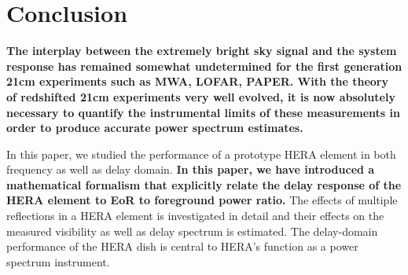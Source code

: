 \documentclass[twocolumn]{emulateapj}
\begin{document}
    \section{\textbf{Conclusion}}
     \textbf{The interplay between the extremely bright sky signal and the system response
    has remained somewhat undetermined for the first generation 21cm experiments such
    as MWA, LOFAR, PAPER. With the theory of redshifted 21cm experiments very
    well evolved, it is now absolutely necessary to quantify the instrumental limits
    of these measurements in order to produce accurate power spectrum estimates.}
    
    
    In this paper, we studied the performance of a prototype HERA element in both frequency
    as well as delay domain. \textbf{In this paper, we have introduced a mathematical formalism that explicitly
    relate the delay response of the HERA element to EoR to foreground power ratio.}
    The effects of multiple reflections  in a HERA
    element is investigated in detail and their effects on the measured
    visibility as well as delay spectrum is estimated.  The delay-domain
    performance of the HERA dish is central to HERA's function as a power spectrum
    instrument. 
    
\end{document}
